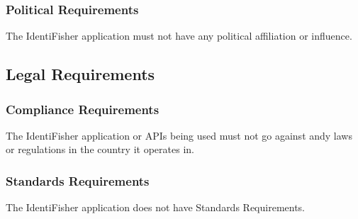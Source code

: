 \documentclass{article}
\begin{document}
\subsubsection{Political Requirements}
The IdentiFisher application must not have any political affiliation or influence.

\subsection{Legal Requirements}
\subsubsection{Compliance Requirements}
The IdentiFisher application or APIs being used must not go against andy laws or regulations in the country it operates in.
\subsubsection{Standards Requirements}
The IdentiFisher application does not have Standards Requirements.

\newpage
\listoffigures
\end{document}
